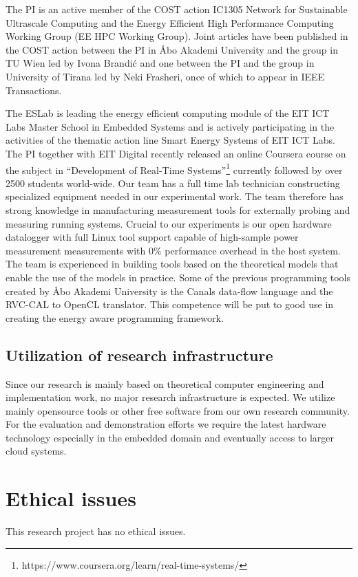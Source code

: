 \documentclass{article}
\begin{document}
The PI is an active member of the COST action IC1305 Network for Sustainable Ultrascale Computing and the Energy Efficient High Performance Computing Working Group (EE HPC Working Group). 
Joint articles have been published in the COST action between the PI in \AA{}bo Akademi University and the group in TU Wien led by Ivona Brandi\'{c} and one between the PI and the group in University of Tirana led by Neki Frasheri, once of which to appear in IEEE Transactions.\smallskip

The ESLab is leading the energy efficient computing module of the EIT ICT Labs Master School in Embedded Systems and is actively participating in the activities of the thematic action line Smart Energy Systems of EIT ICT Labs.
The PI together with EIT Digital recently released an online Coursera course on the subject in ``Development of Real-Time Systems''\footnote{https://www.coursera.org/learn/real-time-systems/} currently followed by over 2500 students world-wide.
Our team has a full time lab technician constructing specialized equipment needed in our experimental work. 
The team therefore has strong knowledge in manufacturing measurement tools for externally probing and measuring running systems. 
Crucial to our experiments is our open hardware datalogger with full Linux tool support capable of high-sample power measurement measurements with 0\% performance overhead in the host system. 
The team is experienced in building tools based on the theoretical models that enable the use of the models in practice. 
Some of the previous programming tools created by \AA{}bo Akademi University is the Canals data-flow language and the RVC-CAL to OpenCL translator. 
This competence will be put to good use in creating the energy aware programming framework.

\subsection{Utilization of research infrastructure}
Since our research is mainly based on theoretical computer engineering and implementation work, no major research infrastructure is expected.
We utilize mainly opensource tools or other free software from our own research community.
For the evaluation and demonstration efforts we require the latest hardware technology especially in the embedded domain and eventually access to larger cloud systems.

\section{Ethical issues}
This research project has no ethical issues.
\end{document}

